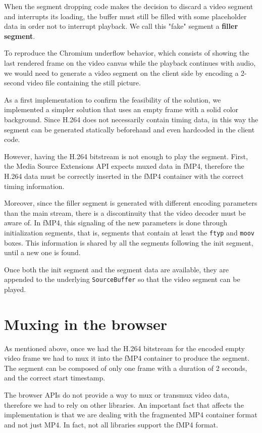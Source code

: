 When the segment dropping code makes the decision to discard a video segment and interrupts its loading, the buffer must still be filled with some placeholder data in order not to interrupt playback. We call this "fake" segment a \textbf{filler segment}.

To reproduce the Chromium underflow behavior, which consists of showing the last rendered frame on the video canvas while the playback continues with audio, we would need to generate a video segment on the client side by encoding a 2-second video file containing the still picture.

As a first implementation to confirm the feasibility of the solution, we implemented a simpler solution that uses an empty frame with a solid color background. Since H.264 does not necessarily contain timing data, in this way the segment can be generated statically beforehand and even hardcoded in the client code.

However, having the H.264 bitstream is not enough to play the segment. First, the Media Source Extensions API expects muxed data in fMP4, therefore the H.264 data must be correctly inserted in the fMP4 container with the correct timing information.

Moreover, since the filler segment is generated with different encoding parameters than the main stream, there is a discontinuity that the video decoder must be aware of. In fMP4, this signaling of the new parameters is done through initialization segments, that is, segments that contain at least the \texttt{ftyp} and \texttt{moov} boxes. This information is shared by all the segments following the init segment, until a new one is found.

Once both the init segment and the segment data are available, they are appended to the underlying \texttt{SourceBuffer} so that the video segment can be played.

\section{Muxing in the browser}
\label{sec:improvements/muxing}

As mentioned above, once we had the H.264 bitstream for the encoded empty video frame we had to mux it into the fMP4 container to produce the segment. The segment can be composed of only one frame with a duration of 2 seconds, and the correct start timestamp.

The browser APIs do not provide a way to mux or transmux video data, therefore we had to rely on other libraries. An important fact that affects the implementation is that we are dealing with the fragmented MP4 container format and not just MP4. In fact, not all libraries support the fMP4 format.

